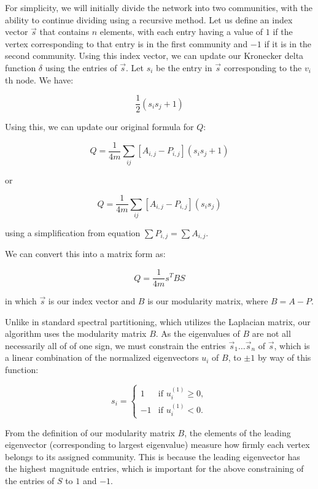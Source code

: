 \documentclass{article}
\begin{document}
\bigskip

For simplicity, we will initially divide the network into two communities, with the ability to continue dividing using a recursive method.
Let us define an index vector $\vec{s}$ that contains $n$ elements, with each entry having a value of $1$ if the vertex corresponding to that entry is in the first community and $-1$ if it is in the second community.
Using this index vector, we can update our Kronecker delta function $\delta$ using the entries of $\vec{s}$. 
Let $s_i$ be the entry in $\vec{s}$ corresponding to the $v_i$th node. We have:

$$ \frac{1}{2} (s_i s_j + 1) $$

\bigskip 

Using this, we can update our original formula for $Q$:

$$ Q = \dfrac{1}{4m}\sum_{ij} [A_{i,j} - P_{i,j}](s_i s_j + 1) $$

or 

$$ Q = \dfrac{1}{4m}\sum_{ij} [A_{i,j} - P_{i,j}](s_i s_j) $$

using a simplification from equation $\sum P_{i,j} = \sum A_{i,j}$. 

\bigskip 

We can convert this into a matrix form as:

$$ Q = \dfrac{1}{4m}s^T B S $$

in which $\vec{s}$ is our index vector and $B$ is our modularity matrix, where $B = A - P$.

\bigskip

Unlike in standard spectral partitioning, which utilizes the Laplacian matrix, our algorithm uses the modularity matrix $B$.
As the eigenvalues of $B$ are not all necessarily all of of one sign, we must constrain the entries $\vec{s}_1 \dots \vec{s}_n$ of $\vec{s}$, 
which is a linear combination of the normalized eigenvectors $u_i$ of $B$, to $\pm 1$ by way of this function:

\bigskip

\indent \[s_i = 
  \begin{cases}
    1 & \text{if } u^{(1)}_{i} \geq 0, \\
    -1 & \text{if } u^{(1)}_{i} < 0.   
  \end{cases} \]

\bigskip

From the definition of our modularity matrix $B$, the elements of the leading eigenvector (corresponding to largest eigenvalue) measure how firmly each vertex belongs to its assigned community.
This is because the leading eigenvector has the highest magnitude entries, which is important for the above constraining of the entries of $S$ to $1$ and $-1$.
\end{document}
